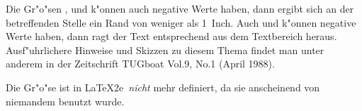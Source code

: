 Die Gr"o"sen ,  und 
k"onnen auch negative Werte haben, dann ergibt sich an der betreffenden
Stelle ein Rand von weniger als 1~Inch.  Auch  und
 k"onnen negative Werte haben, dann ragt der Text
entsprechend aus dem Textbereich heraus. Ausf"uhrlichere Hinweise und
Skizzen zu diesem Thema findet man unter anderem in der Zeitschrift {\sc
TUGboat} Vol.9, No.1 (April 1988).

Die Gr"o"se  ist in \LaTeX2e\ \emph{nicht} 
mehr definiert, da sie anscheinend von niemandem benutzt wurde.



\begin{fullpage}


\newcommand{\X}[1]{{#1}\index{{#1}}}
\newcount\T      %


\newcommand{\NAMEBOX}[8]{\put(#1,#2){\begin{picture}(0,0)(-#3,-#4)\ignorespaces
    \framebox(#5,#6)[#7]{#8}\end{picture}}}

\newcommand{\HARROW}[8]{\put(#1,#2){\begin{picture}(0,0)(-#3,-#4)\ignorespaces
    \put(0,0){\vector(1,0){#5}}\ignorespaces
    \put(#5,0){\vector(-1,0){#5}}\ignorespaces
    \ifthenelse{\equal{#6}{b}}{\ignorespaces
      \put(0,-\TAD){\makebox(#5,0)[#7]{#8}}
    }{\ignorespaces
    \ifthenelse{\equal{#6}{t}}{}{\ignorespaces
      \typeout{Side #6 must be ``b'' or ``t''--``t'' assumed}}\ignorespaces
      \put(0,\TAD){\makebox(#5,0)[#7]{#8}}
    }
    \end{picture}}}


\end{fullpage}

